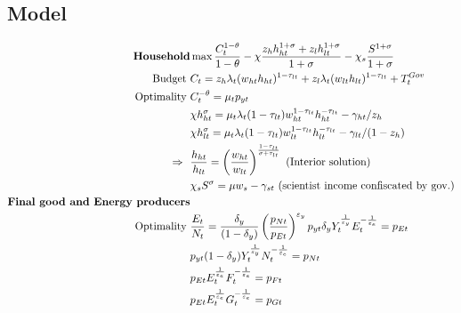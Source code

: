 \subsection{Model}
\begin{align}
\text{\textbf{Household}}& \max \frac{C_t^{1-\theta}}{1-\theta}-\chi\frac{z_hh_{ht}^{1+\sigma}+z_lh_{lt}^{1+\sigma}}{1+\sigma}-\chi_s\frac{S^{1+\sigma}}{{1+\sigma}} %
\\
\text{Budget}\ \vspace{4mm}& C_t=z_h \lambda_t (w_{ht}h_{ht})^{1-\tau_{lt}}+z_l \lambda_t (w_{lt}h_{lt})^{1-\tau_{lt}}+T^{Gov}_t\\
\text{Optimality}\ \vspace{4mm}
& C_t^{-\theta}= \mu_tp_{yt}\\
& \chi h_{ht}^{\sigma}=\mu_t \lambda_t(1-\tau_{lt})w_{ht}^{1-\tau_{lt}}h_{ht}^{-\tau_{lt}}-\gamma_{ht}/z_h\\
& \chi h_{lt}^{\sigma}=\mu_t \lambda_t(1-\tau_{lt})w_{lt}^{1-\tau_{lt}}h_{lt}^{-\tau_{lt}}-\gamma_{lt}/(1-z_h)\\
\Rightarrow\ \ & \frac{h_{ht}}{h_{lt}}=\left(\frac{w_{ht}}{w_{lt}}\right)^{\frac{1-\tau_{lt}}{{\sigma+\tau_{lt}}}}\ \text{(Interior solution)}
\\
& \chi_s S^\sigma =\mu w_s-\gamma_{st}\ \text{(scientist income confiscated by gov.)}\\
\text{\textbf{Final good and Energy producers}}&\\
\text{Optimality}\ \vspace{4mm}&
\frac{E_t}{N_t}=\frac{\delta_y}{(1-\delta_y)}\left(\frac{p_{Nt}}{p_{Et}}\right)^{\varepsilon_y} p_{yt}\delta_yY_t^\frac{1}{\varepsilon_y}E_t^{-\frac{1}{\varepsilon_e}}=p_{Et}\\
& p_{yt}(1-\delta_y)Y_t^\frac{1}{\varepsilon_y}N_t^{-\frac{1}{\varepsilon_e}}=p_{Nt}\\
&
p_{Et}E_t^\frac{1}{\varepsilon_e}{F}_t^{-\frac{1}{\varepsilon_e}}=p_{{F}t}\\
& p_{Et}E_t^\frac{1}{\varepsilon_e}G_t^{-\frac{1}{\varepsilon_e}}=p_{Gt}\\

\end{align}
